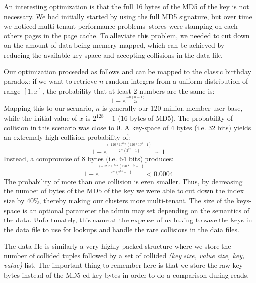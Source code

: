 An interesting optimization is that the full 16 bytes of the MD5 of
the key is not necessary. We had initially started by using the full
MD5 signature, but over time we noticed multi-tenant performance
problems: stores were stamping on each others pages in the page cache.
To alleviate this problem, we needed to cut down on the amount of data
being memory mapped, which can be achieved by reducing the available
key-space and accepting collisions in the data file. 

Our optimization proceeded as follows and can be mapped to the classic
birthday paradox: if we want to retrieve $n$ random integers from a
uniform distribution of range $[1, x]$, the probability that at least
2 numbers are the same is:
\begin{equation}
1 - e^{\frac{-n(n-1)}{2x}}
\end{equation}
Mapping this to our scenario, $n$ is generally our 120 million member
user base, while the initial value of $x$ is $2^{128} - 1$ (16 bytes
of MD5). The probability of collision in this scenario was close to 0.
A key-space of 4 bytes (i.e. 32 bits) yields an extremely high
collision probability of:
\begin{equation}
1 - e^{\frac{(-120*10^{6} * (120*10^{6} - 1)}{2 * (2^{32} - 1)}} \sim 1
\end{equation}
Instead, a compromise of 8 bytes (i.e. 64 bits) produces:
\begin{equation} 
1 - e^{\frac{(-120*10^{6} * (120*10^{6} - 1)} { 2 * (2^{64} - 1 )}} < 0.0004
\end{equation}
The probability of more than one collision is even smaller. Thus, by
decreasing the number of bytes of the MD5 of the key we were able to
cut down the index size by 40\%, thereby making our clusters more
multi-tenant. The size of the keys-space is an optional parameter the
admin may set depending on the semantics of the data. Unfortunately,
this came at the expense of us having to save the keys in the data
file to use for lookups and handle the rare collisions in the data
files.

The data file is similarly a very highly packed structure where we
store the number of collided tuples followed by a set of collided
\emph{(key size, value size, key, value)} list. The important thing to
remember here is that we store the raw key bytes instead of the MD5-ed
key bytes in order to do a comparison during reads. 



